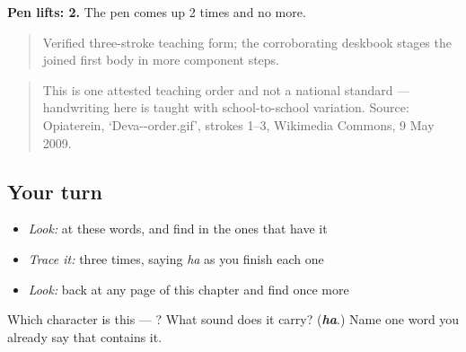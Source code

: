 \textbf{Pen lifts: 2.} The pen comes up 2 times and no more.

\begin{quote}
Verified three-stroke teaching form; the corroborating deskbook stages the joined first body in more component steps.
\end{quote}

\begin{quote}
This is one attested teaching order and not a national standard — handwriting here is taught with school-to-school variation. Source: Opiaterein, ‘Deva--order.gif’, strokes 1–3, Wikimedia Commons, 9 May 2009.
\end{quote}

\subsection*{Your turn}
\begin{itemize}
\raggedright
  \item \emph{Look:} at these words, and find  in the ones that have it
\end{itemize}

\begin{quote}
\end{quote}

\begin{itemize}
\raggedright
  \item \emph{Trace it:}  three times, saying \emph{ha} as you finish each one
  \item \emph{Look:} back at any page of this chapter and find  once more
\end{itemize}

\begin{tcolorbox}[breakable,colback=teal!4,colframe=teal!35!black,title={Before you move on}]
Which character is this — ? What sound does it carry? (\emph{\textbf{ha}}.) Name one word you already say that contains it.
\end{tcolorbox}
